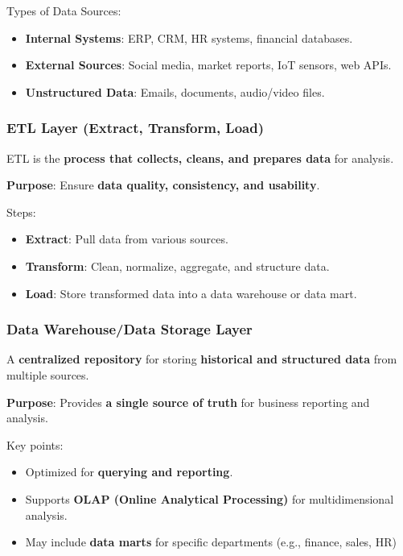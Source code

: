 Types of Data Sources:

\begin{itemize}
    \item \textbf{Internal Systems}: ERP, CRM, HR systems, financial databases.
    \item \textbf{External Sources}: Social media, market reports, IoT sensors, web APIs.
    \item \textbf{Unstructured Data}: Emails, documents, audio/video files.
\end{itemize}

\subsubsection{ETL Layer (Extract, Transform, Load)}

\indent

ETL is the \textbf{process that collects, cleans, and prepares data} for analysis.

\textbf{Purpose}: Ensure \textbf{data quality, consistency, and usability}.

Steps:

\begin{itemize}
    \item \textbf{Extract}: Pull data from various sources.
    \item \textbf{Transform}: Clean, normalize, aggregate, and structure data.
    \item \textbf{Load}: Store transformed data into a data warehouse or data mart.
\end{itemize}

\subsubsection{Data Warehouse/Data Storage Layer}

\indent 

A \textbf{centralized repository} for storing \textbf{historical and structured data} from multiple sources.

\textbf{Purpose}: Provides \textbf{a single source of truth} for business reporting and analysis.

Key points:

\begin{itemize}
    \item Optimized for \textbf{querying and reporting}.
    \item Supports \textbf{OLAP (Online Analytical Processing)} for multidimensional analysis.
    \item May include \textbf{data marts} for specific departments (e.g., finance, sales, HR)
\end{itemize}

